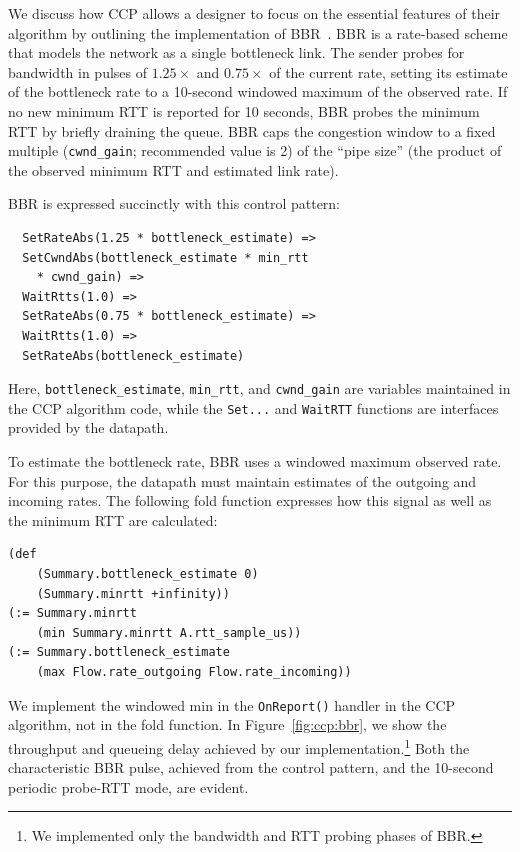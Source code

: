 We discuss how CCP allows a designer to focus on the essential features of their algorithm by outlining the implementation of BBR~\cite{bbr}. BBR is a rate-based scheme that models the network as a single bottleneck link. The sender probes for bandwidth in pulses of $1.25\times$ and $0.75\times$ of the current rate, setting its estimate of the bottleneck rate to a 10-second windowed maximum of the observed rate. If no new minimum RTT is reported for 10 seconds, BBR probes the minimum RTT by briefly draining the queue. BBR caps the congestion window to a fixed multiple (\texttt{cwnd\_gain}; recommended value is 2) of the ``pipe size'' (the product of the observed minimum RTT and estimated link rate). 

BBR is expressed succinctly with this control pattern:
\begin{verbatim}
  SetRateAbs(1.25 * bottleneck_estimate) =>
  SetCwndAbs(bottleneck_estimate * min_rtt
    * cwnd_gain) =>
  WaitRtts(1.0) =>
  SetRateAbs(0.75 * bottleneck_estimate) => 
  WaitRtts(1.0) => 
  SetRateAbs(bottleneck_estimate)
\end{verbatim}

Here, \texttt{bottleneck\_estimate}, \texttt{min\_rtt}, and \texttt{cwnd\_gain} are variables maintained in the CCP algorithm code, while the \texttt{Set...} and \texttt{WaitRTT} functions are interfaces provided by the datapath. 

To estimate the bottleneck rate, BBR uses a windowed maximum observed rate. For this purpose, the datapath must maintain estimates of the outgoing and incoming rates. The following fold function expresses how this signal as well as the minimum RTT are calculated: 
\begin{verbatim}
(def 
    (Summary.bottleneck_estimate 0) 
    (Summary.minrtt +infinity))
(:= Summary.minrtt 
    (min Summary.minrtt A.rtt_sample_us))
(:= Summary.bottleneck_estimate 
    (max Flow.rate_outgoing Flow.rate_incoming))
\end{verbatim}

We implement the windowed min in the \texttt{OnReport()} handler in the CCP algorithm, not in the fold function. In Figure~\ref{fig:ccp:bbr}, we show the throughput and queueing delay achieved by our implementation.\footnote{We implemented only the bandwidth and RTT probing phases of BBR.} Both the characteristic BBR pulse, achieved from the control pattern, and the 10-second periodic probe-RTT mode, are evident.

